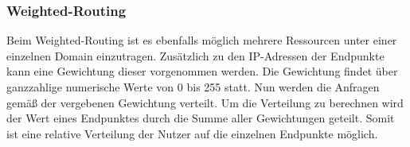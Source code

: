\subsubsection{Weighted-Routing}
Beim Weighted-Routing ist es ebenfalls möglich mehrere Ressourcen unter einer einzelnen Domain einzutragen. Zusätzlich zu den IP-Adressen der Endpunkte kann eine Gewichtung dieser vorgenommen werden. Die Gewichtung findet über ganzzahlige numerische Werte von 0 bis 255 statt. Nun werden die Anfragen gemäß der vergebenen Gewichtung verteilt. Um die Verteilung zu berechnen wird der Wert eines Endpunktes durch die Summe aller Gewichtungen geteilt. Somit ist eine relative Verteilung der Nutzer auf die einzelnen Endpunkte möglich.